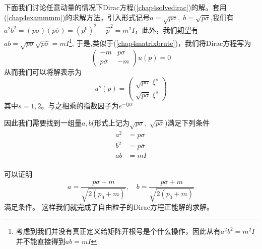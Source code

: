 下面我们讨论任意动量的情况下Dirac方程(\ref{chap4solvedirac})的解。套用(\ref{chap4exammmm})的求解方法，引入形式记号$a=\sqrt{p\sigma},\;b=\sqrt{p\overline{\sigma}}$,我们有$a^{2}b^{2}=(p\sigma)(p\overline{\sigma})=(p^{0})^{2}-\vec{p}^{2}=m^{2}I$，此外，我们期望有$ab=\sqrt{p\sigma}\sqrt{p\overline{\sigma}}=mI$\footnote{考虑到我们并没有真正定义给矩阵开根号是个什么操作，因此从有$a^{2}b^{2}=m^{2}I$并不能直接得到$ab=mI$},
于是,类似于(\ref{chap4matrixbrute})，我们将Dirac方程写为
\begin{equation}
\label{chap4Diracneww}
    \left(\begin{array}{cc}
        -m & {p\sigma} \\
        {p\overline{\sigma}} & -m
    \end{array}\right)u(p)=0
\end{equation}
从而我们可以将解表示为
\begin{equation}
\label{chap4diracU}
    u^{s}(p)=\left(\begin{array}{cc}
         \sqrt{p\sigma}\;\xi^{s}  \\
         \sqrt{p\overline{\sigma}}\;\xi^{s} 
    \end{array}\right)
\end{equation}
其中$s=1,2$。与之相乘的指数因子为$e^{-ipx}$

因此我们需要找到一组量$a,b$(形式上记为$\sqrt{p\sigma},\;\sqrt{p\overline{\sigma}}$)满足下列条件
\begin{equation}
    \begin{aligned}
    a^{2}&=p\sigma\\
     b^{2}&=p\overline{\sigma}\\
      ab&=mI\\
    \end{aligned}
\end{equation}

可以证明
\begin{equation}
    a=\frac{p\sigma+m}{\sqrt{2(p_{0}+m)}},\quad  b=\frac{p\overline{\sigma}+m}{\sqrt{2(p_{0}+m)}}
\end{equation}
满足条件。
这样我们就完成了自由粒子的Dirac方程正能解的求解。

